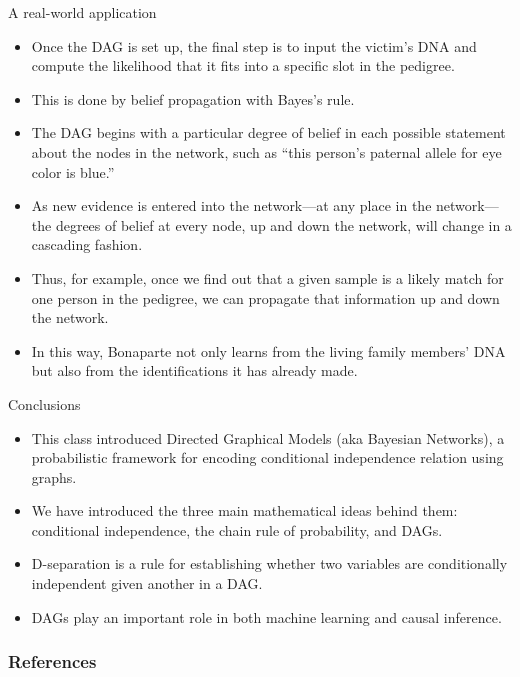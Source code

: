 \documentclass[handout]{beamer}
\begin{document}
\begin{frame}{A real-world application}
\scriptsize{
\begin{itemize}

\item Once the DAG is set up, the final step is to input the victim's
DNA and compute the likelihood that it fits into a specific slot in the pedigree.

\item This is done by belief propagation with Bayes’s rule.

\item The DAG begins with a particular degree of belief in each possible statement about the nodes in the network, such as ``this person's paternal allele for eye color is blue.'' 
\item As new evidence is entered into the network—at any place in the network—the degrees of belief at every node, up and down the network, will change in a cascading fashion. 
\item Thus, for example, once we find out that a given sample is
a likely match for one person in the pedigree, we can propagate that
information up and down the network. 
\item In this way, Bonaparte not only learns from the living family members' DNA but also from the identifications it has already made.
\end{itemize}



} 

\end{frame}




\begin{frame}{Conclusions}
\scriptsize{

\begin{itemize}
\item This class introduced Directed Graphical Models (aka Bayesian Networks), a probabilistic framework for encoding conditional independence relation using graphs.

\item We have introduced the three main mathematical ideas behind them: conditional independence, the chain rule of probability, and DAGs.

\item D-separation is a rule for establishing whether two variables are conditionally independent given another in a DAG.

\item DAGs play an important role in both machine learning and causal inference.



\end{itemize}


} 
\end{frame}


\begin{frame}[allowframebreaks]\scriptsize
\frametitle{References}


%
\end{frame}  









\end{document}
